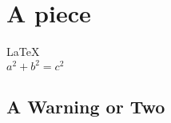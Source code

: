 \documentclass{article}
\begin{document}
               
 
\section{A piece}          
\LaTeX \,\\ 
 $a^2+b^2=c^2$

\subsection{A Warning or Two}  

\end{document}
